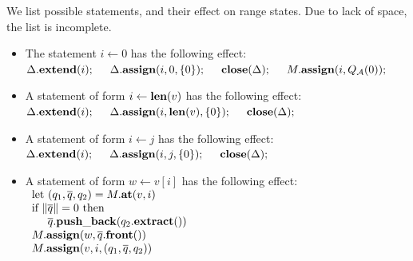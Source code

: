 We list possible statements, and their effect on range states.
Due to lack of space, the list is incomplete. 
\begin{itemize}
\item
   The statement $ i \leftarrow 0 $ has the following effect: \\
   \hspace*{1.0cm}
   $ 
      \Delta. {\bf extend}(i); \hspace*{0.5cm} 
      \Delta. {\bf assign}(i,0, \{ 0 \} ); \hspace*{0.5cm}
      {\bf close}( \Delta ); \hspace*{0.5cm}
      M. {\bf assign}( i, Q_{\cal A}(0) );
   $ 
\item
   A statement of form $ i \leftarrow {\bf len}(v) $
   has the following effect: \\
   \hspace*{1.0cm} 
   $ 
         \Delta. {\bf extend}(i); \hspace*{0.5cm}
         \Delta. {\bf assign}(i, {\bf len}(v), \{ 0 \} ); \hspace*{0.5cm}
         {\bf close}( \Delta );
   $
\item
   A statement of form $ i \leftarrow j $ 
   has the following effect: \\
   \hspace*{1.0cm} 
   $
         \Delta. {\bf extend}(i); \hspace*{0.5cm}
         \Delta. {\bf assign}(i, j, \{ 0 \} ); \hspace*{0.5cm}
         {\bf close}( \Delta ); 
   $
\item
   A statement of form $ w \leftarrow v[i] $
   has the following effect: \\
   \hspace*{1.0cm} 
   $ \begin{array}{l}
      {\rm let} \ ( q_1, \overline{q}, q_2 ) = M. {\bf at}(v,i) \\
      \mbox{if} \ \| \overline{q} \| = 0 \ \mbox{then} \\
      \hspace*{0.5cm} \overline{q}. {\bf push\_back}( q_2. {\bf extract}( )) \\
      M. {\bf assign}( w, \overline{q}. {\bf front}( )) \\
      M. {\bf assign}( v,i, ( q_1, \overline{q}, q_2 ) ) \\
      \end{array}
   $ \\ \\ 

\end{itemize}
